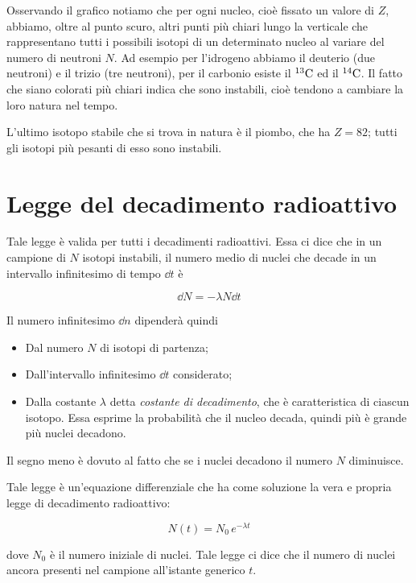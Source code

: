 Osservando il grafico notiamo che per ogni nucleo, cioè fissato un valore di $Z$, abbiamo, oltre al punto scuro, altri punti più chiari lungo la verticale che rappresentano tutti i possibili isotopi di un determinato nucleo al variare del numero di neutroni $N$. Ad esempio per l'idrogeno abbiamo il deuterio (due neutroni) e il trizio (tre neutroni), per il carbonio esiste il $\rm ^{13}C$ ed il $\rm ^{14}C$. Il fatto che siano colorati più chiari indica che sono instabili, cioè tendono a cambiare la loro natura nel tempo.

L'ultimo isotopo stabile che si trova in natura è il piombo, che ha $Z=82$; tutti gli isotopi più pesanti di esso sono instabili.

\section{Legge del decadimento radioattivo}

Tale legge è valida per tutti i decadimenti radioattivi. Essa ci dice che in un campione di $N$ isotopi instabili, il numero medio di nuclei che decade in un intervallo infinitesimo di tempo $\dd{t}$ è

\begin{equation*}
    \dd{N}=-\lambda N\dd{t}
\end{equation*}

Il numero infinitesimo $\dd{n}$ dipenderà quindi

\begin{itemize}
    \item Dal numero $N$ di isotopi di partenza;
    \item Dall'intervallo infinitesimo $\dd{t}$ considerato;
    \item Dalla costante $\lambda$ detta \textit{costante di decadimento}, che è caratteristica di ciascun isotopo. Essa esprime la probabilità che il nucleo decada, quindi più è grande più nuclei decadono.
\end{itemize}

Il segno meno è dovuto al fatto che se i nuclei decadono il numero $N$ diminuisce.

Tale legge è un'equazione differenziale che ha come soluzione la vera e propria legge di decadimento radioattivo:

\begin{equation*}
    N(t)=N_0\,e^{-\lambda t}
\end{equation*}

dove $N_0$ è il numero iniziale di nuclei. Tale legge ci dice che il numero di nuclei ancora presenti nel campione all'istante generico $t$.

